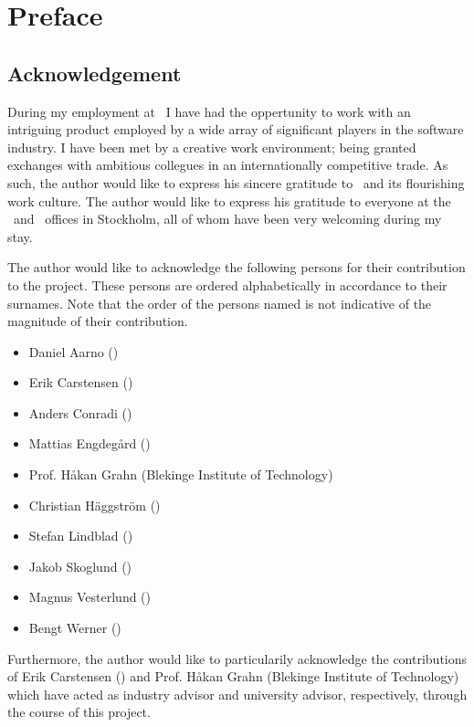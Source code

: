 
\chapter*{Preface}
\label{cha:preface}

\section*{Acknowledgement}
\label{sec:preface_acknowledgement}
During my employment at \dvttermintel\ I have had the oppertunity to work with an intriguing product employed by a wide array of significant players in the software industry.
I have been met by a creative work environment; being granted exchanges with ambitious collegues in an internationally competitive trade.
As such, the author would like to express his sincere gratitude to \dvttermintel\ and its flourishing work culture.
The author would like to express his gratitude to everyone at the \dvttermintel\ and \dvttermwindriver\ offices in Stockholm, all of whom have been very welcoming during my stay.

The author would like to acknowledge the following persons for their contribution to the project.
These persons are ordered alphabetically in accordance to their surnames.
Note that the order of the persons named is not indicative of the magnitude of their contribution.

\begin{itemize}[noitemsep]
\item Daniel Aarno (\dvttermintel )
\item Erik Carstensen (\dvttermintel )
\item Anders Conradi (\dvttermintel )
\item Mattias Engdegård (\dvttermintel )
\item Prof. Håkan Grahn (Blekinge Institute of Technology)
\item Christian Häggström (\dvttermintel )
\item Stefan Lindblad (\dvttermintel )
\item Jakob Skoglund (\dvttermwindriver )
\item Magnus Vesterlund (\dvttermwindriver )
\item Bengt Werner (\dvttermintel )
\end{itemize}

Furthermore, the author would like to particularily acknowledge the contributions of Erik Carstensen (\dvttermintel ) and Prof. Håkan Grahn (Blekinge Institute of Technology) which have acted as industry advisor and university advisor, respectively, through the course of this project.

